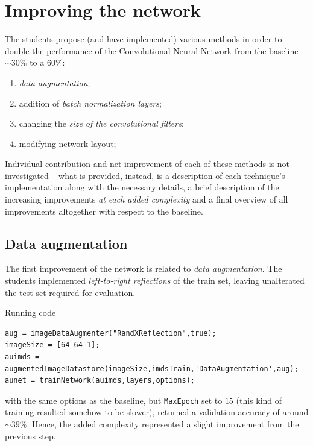 \documentclass[a4paper, 11pt]{article} %
\begin{document}
\clearpage

\section{Improving the network}\label{sec:improved-network}

The students propose (and have implemented) various methods in order to double the performance of the Convolutional Neural Network from the baseline $\sim 30\%$ to a $60\%$:

\begin{enumerate}
    \item \emph{data augmentation};
    \item addition of \emph{batch normalization layers};
    \item changing the \emph{size of the convolutional filters};
    \item modifying network layout;
\end{enumerate}

Individual contribution and net improvement of each of these methods is not investigated \--- what is provided, instead, is a description of each technique's implementation along with the necessary details, a brief description of the increasing improvements \emph{at each added complexity} and a final overview of all improvements altogether with respect to the baseline. 

\subsection{Data augmentation}\label{sec:data-augmentation}

The first improvement of the network is related to \emph{data augmentation}. The students implemented \emph{left-to-right reflections} of the train set, leaving unalterated the test set required for evaluation.

Running code 

\begin{lstlisting}
aug = imageDataAugmenter("RandXReflection",true);
imageSize = [64 64 1];
auimds = augmentedImageDatastore(imageSize,imdsTrain,'DataAugmentation',aug);
aunet = trainNetwork(auimds,layers,options);
\end{lstlisting}

with the same options as the baseline, but \texttt{MaxEpoch} set to $15$ (this kind of training resulted somehow to be slower), returned a validation accuracy of around $\sim 39\%$. Hence, the added complexity represented a slight improvement from the previous step.
\end{document}

